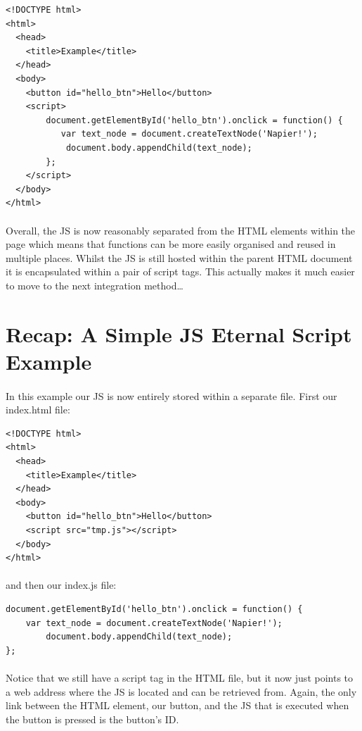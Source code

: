 \begin{lstlisting}
<!DOCTYPE html>
<html>
  <head>
    <title>Example</title>
  </head>
  <body>
    <button id="hello_btn">Hello</button>
    <script>
        document.getElementById('hello_btn').onclick = function() {
           var text_node = document.createTextNode('Napier!');
            document.body.appendChild(text_node);   
        };
    </script>
  </body>
</html>
\end{lstlisting}

\paragraph{} Overall, the JS is now reasonably separated from the HTML elements within the page which means that functions can be more easily organised and reused in multiple places. Whilst the JS is still hosted within the parent HTML document it is encapsulated within a pair of script tags. This actually makes it much easier to move to the next integration method\dots


\section{Recap: A Simple JS Eternal Script Example}
\paragraph{} In this example our JS is now entirely stored within a separate file. First our index.html file:

\begin{lstlisting}
<!DOCTYPE html>
<html>
  <head>
    <title>Example</title>
  </head>
  <body>
    <button id="hello_btn">Hello</button>
    <script src="tmp.js"></script>
  </body>
</html>
\end{lstlisting}

\paragraph{} and then our index.js file:

\begin{lstlisting}
document.getElementById('hello_btn').onclick = function() {
    var text_node = document.createTextNode('Napier!');
        document.body.appendChild(text_node);   
};
\end{lstlisting}

\paragraph{} Notice that we still have a script tag in the HTML file, but it now just points to a web address where the JS is located and can be retrieved from. Again, the only link between the HTML element, our button, and the JS that is executed when the button is pressed is the button's ID.

